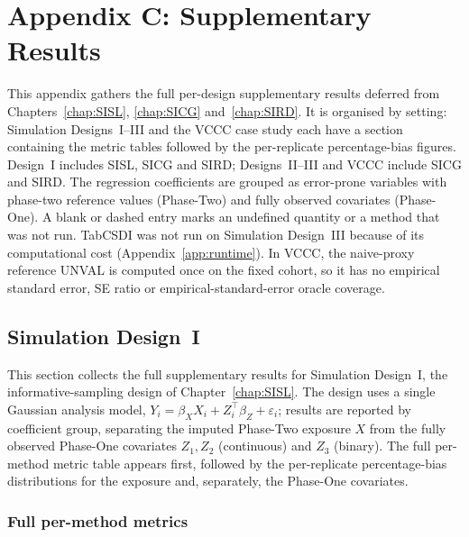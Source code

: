 \chapter{Appendix C: Supplementary Results}
\label{app:suppresults}\label{app:supp_fullsim}

This appendix gathers the full per-design supplementary results deferred from Chapters~\ref{chap:SISL}, \ref{chap:SICG} and~\ref{chap:SIRD}. It is organised by setting: Simulation Designs~I--III and the VCCC case study each have a section containing the metric tables followed by the per-replicate percentage-bias figures. Design~I includes SISL, SICG and SIRD; Designs~II--III and VCCC include SICG and SIRD. The regression coefficients are grouped as error-prone variables with phase-two reference values (Phase-Two) and fully observed covariates (Phase-One). A blank or dashed entry marks an undefined quantity or a method that was not run. TabCSDI was not run on Simulation Design~III because of its computational cost (Appendix~\ref{app:runtime}). In VCCC, the naive-proxy reference UNVAL is computed once on the fixed cohort, so it has no empirical standard error, SE ratio or empirical-standard-error oracle coverage.

\clearpage
\section{Simulation Design~I}
\label{app:suppC_sisl}

This section collects the full supplementary results for Simulation Design~I, the informative-sampling design of Chapter~\ref{chap:SISL}. The design uses a single Gaussian analysis model, $Y_i = \beta_X X_i + Z_i^{\top}\beta_Z + \varepsilon_i$; results are reported by coefficient group, separating the imputed Phase-Two exposure $X$ from the fully observed Phase-One covariates $Z_1,Z_2$ (continuous) and $Z_3$ (binary). The full per-method metric table appears first, followed by the per-replicate percentage-bias distributions for the exposure and, separately, the Phase-One covariates.

\subsection{Full per-method metrics}

